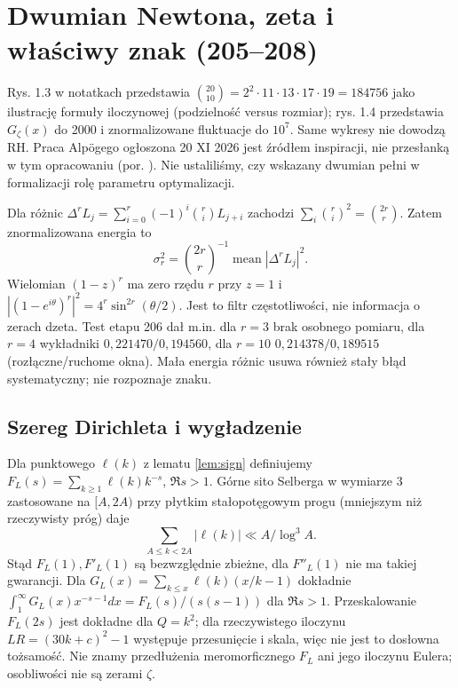 \documentclass[11pt,a4paper]{article}
\theoremstyle{definition}\newtheorem{defn}[tw]{Definicja}
\theoremstyle{remark}\newtheorem*{uw}{Uwaga}
\begin{document}
\section{Dwumian Newtona, zeta i właściwy znak (205--208)}
Rys. 1.3 w notatkach \cite{dupuy} przedstawia
$\binom{20}{10}=2^2\cdot11\cdot13\cdot17\cdot19=184756$ jako ilustrację
formuły iloczynowej (podzielność versus rozmiar); rys. 1.4 przedstawia
$G_\zeta(x)$ do 2000 i znormalizowane fluktuacje do $10^7$. Same wykresy
nie dowodzą RH. Praca Alpögego ogłoszona 20 XI 2026 jest źródłem inspiracji,
nie przesłanką w tym opracowaniu (por. \cite{rub}). Nie ustaliliśmy, czy
wskazany dwumian pełni w formalizacji rolę parametru optymalizacji.

Dla różnic $\Delta^r L_j=\sum_{i=0}^r(-1)^i\binom ri L_{j+i}$ zachodzi
$\sum_i\binom ri^2=\binom{2r}r$. Zatem znormalizowana energia to
\[
 \sigma_r^2=\binom{2r}r^{-1}\operatorname{mean}|\Delta^r L_j|^2.
\]
Wielomian $(1-z)^r$ ma zero rzędu $r$ przy $z=1$ i
$|(1-e^{i\theta})^r|^2=4^r\sin^{2r}(\theta/2)$. Jest to filtr częstotliwości,
nie informacja o zerach dzeta. Test etapu 206 dał m.in. dla $r=3$ brak
osobnego pomiaru, dla $r=4$ wykładniki $0{,}221470/0{,}194560$, dla $r=10$
$0{,}214378/0{,}189515$ (rozłączne/ruchome okna). Mała energia różnic usuwa
również stały błąd systematyczny; nie rozpoznaje znaku.

\subsection{Szereg Dirichleta i wygładzenie}
Dla punktowego $\ell(k)$ z lematu \ref{lem:sign} definiujemy
$F_L(s)=\sum_{k\ge1}\ell(k)k^{-s}$, $\Re s>1$.
Górne sito Selberga w wymiarze 3 zastosowane na $[A,2A)$ przy płytkim
stałopotęgowym progu (mniejszym niż rzeczywisty próg) daje
\begin{equation}\label{eq:upper}
 \sum_{A\le k<2A}|\ell(k)|\ll A/\log^3 A.
\end{equation}
Stąd $F_L(1),F'_L(1)$ są bezwzględnie zbieżne, dla $F''_L(1)$ nie ma
takiej gwarancji. Dla $G_L(x)=\sum_{k\le x}\ell(k)(x/k-1)$ dokładnie
$\int_1^\infty G_L(x)x^{-s-1}dx=F_L(s)/(s(s-1))$ dla $\Re s>1$.
Przeskalowanie $F_L(2s)$ jest dokładne dla $Q=k^2$; dla rzeczywistego
iloczynu $LR=(30k+c)^2-1$ występuje przesunięcie i skala, więc nie jest to
dosłowna tożsamość. Nie znamy przedłużenia meromorficznego $F_L$ ani jego
iloczynu Eulera; osobliwości nie są zerami $\zeta$.
\end{document}
